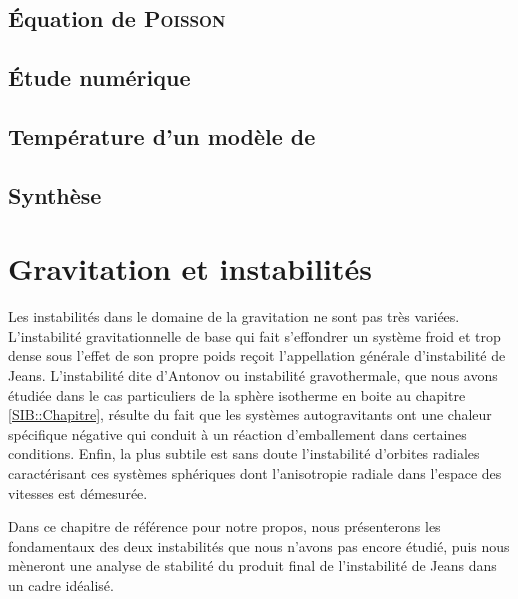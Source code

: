 	\section{Équation de \textsc{Poisson}}
		

	\section{Étude numérique}
		


	\section{Température d'un modèle de \King \label{sec::temp}}
		

	\section{Synthèse}
		


\chapter{Gravitation et instabilités}
	\minitoc

	Les instabilités dans le domaine de la gravitation ne sont pas très variées. L'instabilité gravitationnelle de base qui fait s'effondrer un
	système froid et trop dense sous l'effet de son propre poids reçoit l'appellation générale d'instabilité de Jeans. L'instabilité dite
	d'Antonov ou instabilité gravothermale, que nous avons étudiée dans le cas particuliers de la sphère isotherme en boite au chapitre
	\ref{SIB::Chapitre}, résulte du fait que les systèmes autogravitants ont une chaleur spécifique négative qui conduit à un réaction
	d'emballement dans certaines conditions. Enfin, la plus subtile est sans doute l'instabilité d'orbites radiales caractérisant ces systèmes
	sphériques dont l'anisotropie radiale dans l'espace des vitesses est démesurée.

	Dans ce chapitre de référence pour notre propos, nous présenterons les fondamentaux des deux instabilités que nous n'avons pas encore étudié,
	puis nous mèneront une analyse de stabilité du produit final de l'instabilité de Jeans dans un cadre idéalisé.

